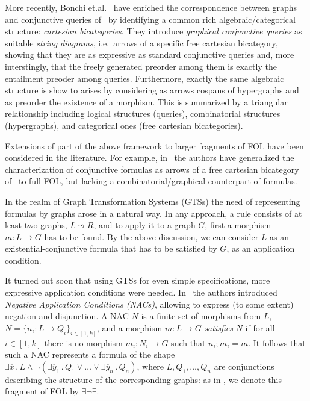 More recently, Bonchi et.al.~\cite{DBLP:conf/csl/BonchiSS18} have enriched the correspondence between graphs and conjunctive queries of~\cite{DBLP:conf/stoc/ChandraM77} by identifying a common rich algebraic/categorical structure: \emph{cartesian bicategories}. They introduce \emph{graphical conjunctive queries} as suitable \emph{string diagrams}, i.e.~arrows of a specific free cartesian bicategory, showing that they are as expressive as standard conjunctive queries and, more interstingly, that the freely generated preorder among them is exactly the entailment preoder among queries. Furthermore, exactly the same algebraic structure is show to arises by considering as arrows cospans of hypergraphs and as preorder the existence of a morphism. This is summarized by a triangular relationship including logical structures (queries), combinatorial structures (hypergraphs), and categorical ones (free cartesian bicategories).     

Extensions of part of the above framework to larger fragments of FOL have been considered in the literature. For example, in~\cite{DBLP:journals/corr/abs-2404-18795} the authors have generalized the characterization of conjunctive formulas as arrows of a free cartesian bicategory of~\cite{DBLP:conf/csl/BonchiSS18} to full FOL, but lacking a combinatorial/graphical counterpart of formulas. 

In the realm of Graph Transformation Systems  (GTSs)
 the need of representing formulas by graphs arose in a natural way. 
 In any approach, a rule consists of at least two graphs, $L \leadsto R$, and to apply it to a graph $G$, first a morphism $m: L \to G$ has to be found. 
 By the above discussion, we can consider $L$ as an existential-conjunctive formula that has to be satisfied by $G$, as an application condition. 

It turned out soon that using GTSs for even simple specifications, more expressive application conditions 
were needed. 
In~\cite{NegativeAC} the authors introduced \emph{Negative Application Conditions (NACs)}, allowing to express (to some extent) negation and disjunction.  A NAC $N$ is  a finite set of morphisms from $L$, $N = \{n_i: L \to Q_i\}_{i\in[1,k]}$, and a morphism $m: L \to G$ \emph{satisfies} $N$ if for all $i\in[1,k]$ there is no morphism $m_i: N_i \to G$ such that $n_i;m_i = m$. 
It follows that such a NAC represents a formula of the shape $\exists \overline{x}\,.\, L \wedge \neg (\exists \overline{y}_1\,.\, Q_1 \vee \ldots \vee \exists \overline{y}_n\,.\, Q_n)$, where $L, Q_1, \ldots,Q_n$ are conjunctions describing the structure of the corresponding graphs: as in \cite{Rensink-FOL}, we denote this fragment of FOL by $\exists \neg \exists$.

